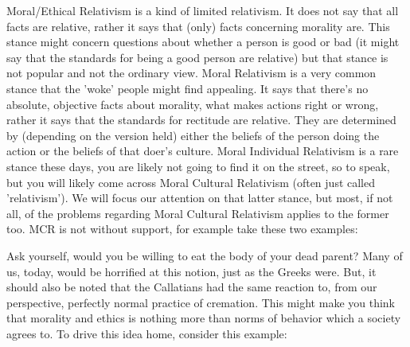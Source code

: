 Moral/Ethical Relativism is a kind of limited relativism. It does not say that all facts are relative, rather it says that (only) facts concerning morality are. This stance might concern questions about whether a person is good or bad (it might say that the standards for being a good person are relative) but that stance is not popular and not the ordinary view. Moral Relativism is a very common stance that the 'woke' people might find appealing. It says that there's no absolute, objective facts about morality, what makes actions right or wrong, rather it says that the standards for rectitude are relative. They are determined by (depending on the version held) either the beliefs of the person doing the action or the beliefs of that doer's culture. Moral Individual Relativism is a rare stance these days, you are likely not going to find it on the street, so to speak, but you will likely come across  Moral Cultural Relativism (often just called 'relativism'). We will focus our attention on that latter stance, but most, if not all, of the problems regarding Moral Cultural Relativism applies to the former too. MCR is not without support, for example take these two examples:


Ask yourself, would you be willing to eat the body of your dead parent? Many of us, today, would be horrified at this notion, just as the Greeks were. But, it should also be noted that the Callatians had the same reaction to, from our perspective, perfectly normal practice of cremation.  This might make you think that morality and ethics is nothing more than norms of behavior which a society agrees to. To drive this idea home, consider this example: 

